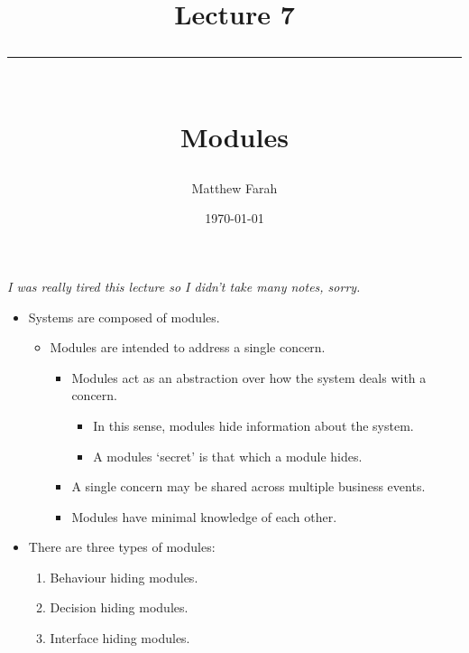 \documentclass{article}
\date{
	\vspace{-.75em}
	{\large \today}
}
\title{
	\vspace*{-1.5em}
	{\Huge Lecture 7} \\
	\vspace{-1em}
	\rule{\textwidth/4}{.01em} \\
	\vspace{-.25em}
	{\Large Modules}
	\vspace{-.75em}
}
\author{
	{\large Matthew Farah}
}
\begin{document}
\maketitle
\pagestyle{fancy}

\fi

\emph{I was really tired this lecture so I didn't take many notes, sorry.} \\

\begin{itemize}
	\item Systems are composed of modules.
	\begin{itemize}
		\item Modules are intended to address a single concern.
		\begin{itemize}
			\item Modules act as an abstraction over how the system deals with a concern.
			\begin{itemize}
				\item In this sense, modules hide information about the system.
				\item A modules `secret' is that which a module hides.
			\end{itemize}
			\item A single concern may be shared across multiple business events.
			\item Modules have minimal knowledge of each other.
		\end{itemize}
	\end{itemize}
	\item There are three types of modules:
	\begin{enumerate}
		\item Behaviour hiding modules.
		\item Decision hiding modules.
		\item Interface hiding modules.
	\end{enumerate}
\end{itemize}

\ifdefined\iscombined
	\newpage
\else
	
\end{document}
